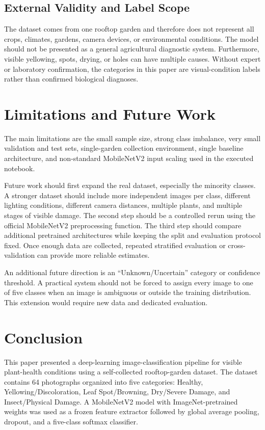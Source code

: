\documentclass[conference]{IEEEtran}
\begin{document}
\subsection{External Validity and Label Scope}
The dataset comes from one rooftop garden and therefore does not represent all crops, climates, gardens, camera devices, or environmental conditions. The model should not be presented as a general agricultural diagnostic system. Furthermore, visible yellowing, spots, drying, or holes can have multiple causes. Without expert or laboratory confirmation, the categories in this paper are visual-condition labels rather than confirmed biological diagnoses.

\section{Limitations and Future Work}
The main limitations are the small sample size, strong class imbalance, very small validation and test sets, single-garden collection environment, single baseline architecture, and non-standard MobileNetV2 input scaling used in the executed notebook.

Future work should first expand the real dataset, especially the minority classes. A stronger dataset should include more independent images per class, different lighting conditions, different camera distances, multiple plants, and multiple stages of visible damage. The second step should be a controlled rerun using the official MobileNetV2 preprocessing function. The third step should compare additional pretrained architectures while keeping the split and evaluation protocol fixed. Once enough data are collected, repeated stratified evaluation or cross-validation can provide more reliable estimates.

An additional future direction is an ``Unknown/Uncertain'' category or confidence threshold. A practical system should not be forced to assign every image to one of five classes when an image is ambiguous or outside the training distribution. This extension would require new data and dedicated evaluation.

\section{Conclusion}
This paper presented a deep-learning image-classification pipeline for visible plant-health conditions using a self-collected rooftop-garden dataset. The dataset contains 64 photographs organized into five categories: Healthy, Yellowing/Discoloration, Leaf Spot/Browning, Dry/Severe Damage, and Insect/Physical Damage. A MobileNetV2 model with ImageNet-pretrained weights was used as a frozen feature extractor followed by global average pooling, dropout, and a five-class softmax classifier.
\end{document}

